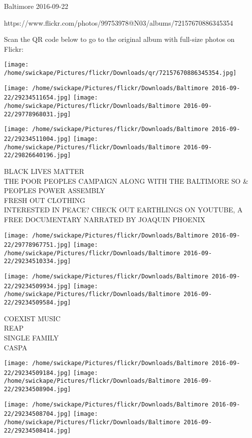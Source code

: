 \documentclass[10pt,letterpaper]{article}
\begin{document}
Baltimore 2016-09-22

https://www.flickr.com/photos/99753978@N03/albums/72157670886345354

Scan the QR code below to go to the original album with full-size photos on Flickr:

\texttt{[image: /home/swickape/Pictures/flickr/Downloads/qr/72157670886345354.jpg]}
\pagebreak

\texttt{[image: /home/swickape/Pictures/flickr/Downloads/Baltimore 2016-09-22/29234511654.jpg]}
\texttt{[image: /home/swickape/Pictures/flickr/Downloads/Baltimore 2016-09-22/29778968031.jpg]}

\texttt{[image: /home/swickape/Pictures/flickr/Downloads/Baltimore 2016-09-22/29234511004.jpg]}
\texttt{[image: /home/swickape/Pictures/flickr/Downloads/Baltimore 2016-09-22/29826640196.jpg]}

BLACK LIVES MATTER\\
THE POOR PEOPLES CAMPAIGN ALONG WITH THE BALTIMORE SO \& PEOPLES POWER ASSEMBLY\\
FRESH OUT CLOTHING\\
INTERESTED IN PEACE?  CHECK OUT EARTHLINGS ON YOUTUBE, A FREE DOCUMENTARY NARRATED BY JOAQUIN PHOENIX\\
\pagebreak

\texttt{[image: /home/swickape/Pictures/flickr/Downloads/Baltimore 2016-09-22/29778967751.jpg]}
\texttt{[image: /home/swickape/Pictures/flickr/Downloads/Baltimore 2016-09-22/29234510334.jpg]}

\texttt{[image: /home/swickape/Pictures/flickr/Downloads/Baltimore 2016-09-22/29234509934.jpg]}
\texttt{[image: /home/swickape/Pictures/flickr/Downloads/Baltimore 2016-09-22/29234509584.jpg]}

COEXIST MUSIC\\
REAP\\
SINGLE FAMILY\\
CASPA\\
\pagebreak

\texttt{[image: /home/swickape/Pictures/flickr/Downloads/Baltimore 2016-09-22/29234509184.jpg]}
\texttt{[image: /home/swickape/Pictures/flickr/Downloads/Baltimore 2016-09-22/29234508904.jpg]}

\texttt{[image: /home/swickape/Pictures/flickr/Downloads/Baltimore 2016-09-22/29234508704.jpg]}
\texttt{[image: /home/swickape/Pictures/flickr/Downloads/Baltimore 2016-09-22/29234508414.jpg]}
\end{document}
